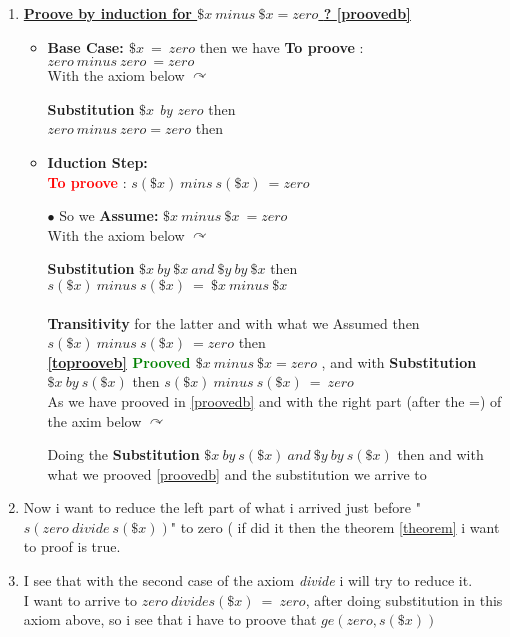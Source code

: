 \begin{enumerate}
\item \underline{\textbf{Proove by induction for $\$x\ minus\ \$x = zero$ \label{toprooveb}? \ref{proovedb} }}\\
\begin{itemize}
\item \textbf{Base Case: $ \$x\ =\ zero $ } then we have \textbf{To proove} : $zero\ minus\ zero\ = zero$\\
With the axiom below $\curvearrowright$

\textbf{Substitution} \textit{$\$x$ by $zero$} then\\
$zero\ minus\ zero = zero$ then \checkmark\\
\item \textbf{Iduction Step:}\\
\textcolor{red}{\textbf{To proove}} : $s(\$x)\ mins\ s(\$x)\ = zero$ \\
\item[$\bullet$] So we \textbf{Assume: }  $\$x\ minus\ \$x\ = zero$ \\
With the axiom below $\curvearrowright$

\textbf{Substitution}
$\$x\ by\  \$x\ \textit{and}\ \$y\  by\  \$x $  then\\
$s(\$x)\ minus\ s(\$x)\ =\ \$x\ minus\ \$x$\\ \\
\textbf{Transitivity} for the latter and with what we Assumed then\\
$s(\$x)\ minus\ s(\$x)\ = zero $  then  \checkmark\\
\textbf{\textcolor{green}{ \ref{toprooveb} Prooved\label{proovedb} }} $\$x\ minus\ \$x = zero$ \checkmark, and with \textbf{Substitution} $ \$x\ by\ s(\$x) $ then 
$s(\$x)\ minus\  s(\$x)\ =\ zero$ \hfill \checkmark\\
As we have prooved in \ref{proovedb} and with the right part (after the =) of the axim below $\curvearrowright$

Doing the \textbf{Substitution} $\$x\ by\ s(\$x)\ and\ \$y\ by\ s(\$x) $ then
 and with what we prooved \ref{proovedb} and the substitution we arrive to 
\label{obtainedfoor}
\end{itemize}
\item Now i want to reduce the left part of what i arrived just before " $s( zero\ divide\ s(\$x) )$" to zero ( if did it then the theorem \textcolor{green}{\ref{theorem}} i want to proof is true.
\newpage
\item I see that with the second case of the axiom \textit{divide} i will try to reduce it.\\ 
I want to arrive to $zero\ divide s(\$x)\ =\ zero$, after doing substitution in this axiom above, so i see that i have to proove that $ge(zero,s(\$x))$\\


\end{enumerate}
